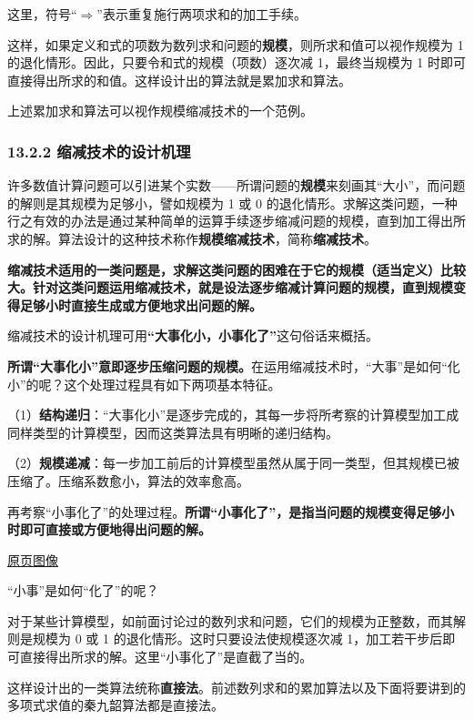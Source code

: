 \documentclass[
  10pt,
  fontset=fandol]{ctexart}
\begin{document}
这里，符号``\(\Rightarrow\)''表示重复施行两项求和的加工手续。

这样，如果定义和式的项数为数列求和问题的\textbf{规模}，则所求和值可以视作规模为 1 的退化情形。因此，只要令和式的规模（项数）逐次减 1，最终当规模为 1 时即可直接得出所求的和值。这样设计出的算法就是累加求和算法。

上述累加求和算法可以视作规模缩减技术的一个范例。

\subsubsection{13.2.2 缩减技术的设计机理}\label{ux7f29ux51cfux6280ux672fux7684ux8bbeux8ba1ux673aux7406}

许多数值计算问题可以引进某个实数------所谓问题的\textbf{规模}来刻画其``大小''，而问题的解则是其规模为足够小，譬如规模为 1 或 0 的退化情形。求解这类问题，一种行之有效的办法是通过某种简单的运算手续逐步缩减问题的规模，直到加工得出所求的解。算法设计的这种技术称作\textbf{规模缩减技术}，简称\textbf{缩减技术}。

\textbf{缩减技术适用的一类问题是，求解这类问题的困难在于它的规模（适当定义）比较大。针对这类问题运用缩减技术，就是设法逐步缩减计算问题的规模，直到规模变得足够小时直接生成或方便地求出问题的解。}

缩减技术的设计机理可用\textbf{``大事化小，小事化了''}这句俗话来概括。

\textbf{所谓``大事化小''意即逐步压缩问题的规模。}在运用缩减技术时，``大事''是如何``化小''的呢？这个处理过程具有如下两项基本特征。

（1）\textbf{结构递归}：``大事化小''是逐步完成的，其每一步将所考察的计算模型加工成同样类型的计算模型，因而这类算法具有明晰的递归结构。

（2）\textbf{规模递减}：每一步加工前后的计算模型虽然从属于同一类型，但其规模已被压缩了。压缩系数愈小，算法的效率愈高。

再考察``小事化了''的处理过程。\textbf{所谓``小事化了''，是指当问题的规模变得足够小时即可直接或方便地得出问题的解。}

\href{../../source-images/pdf-310.jpeg}{原页图像}

``小事''是如何``化了''的呢？

对于某些计算模型，如前面讨论过的数列求和问题，它们的规模为正整数，而其解则是规模为 0 或 1 的退化情形。这时只要设法使规模逐次减 1，加工若干步后即可直接得出所求的解。这里``小事化了''是直截了当的。

这样设计出的一类算法统称\textbf{直接法}。前述数列求和的累加算法以及下面将要讲到的多项式求值的秦九韶算法都是直接法。
\end{document}
